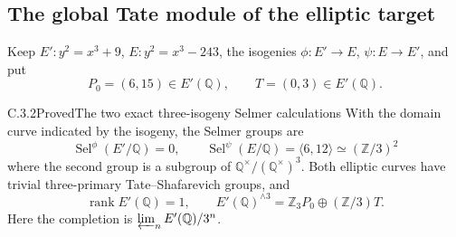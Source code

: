 \subsection{The global Tate module of the elliptic target}
\label{sec:ghost-elliptic-arithmetic}

Keep \(E':y^2=x^3+9\), \(E:y^2=x^3-243\),
the isogenies \(\phi:E'\to E\), \(\psi:E\to E'\),
and put
\[
                  P_0=(6,15)\in E'(\mathbb Q),
                  \qquad T=(0,3)\in E'(\mathbb Q).
\]

\begin{result}{C.3.2}{Proved}{The two exact three-isogeny Selmer calculations}
\label{prop:ghost-elliptic-selmer}
With the domain curve indicated by the isogeny, the
Selmer groups are
\[
 \operatorname{Sel}^{\phi}(E'/\mathbb Q)=0,
 \qquad
 \operatorname{Sel}^{\psi}(E/\mathbb Q)
      =\langle6,12\rangle\simeq(\mathbb Z/3)^2
\]
where the second group is a subgroup of
\(\mathbb Q^\times/(\mathbb Q^\times)^3\).
Both elliptic curves
have trivial three-primary Tate--Shafarevich groups,
and
\[
 \operatorname{rank} E'(\mathbb Q)=1,
 \qquad E'(\mathbb Q)^{\wedge3}
          =\mathbb Z_3 P_0\oplus(\mathbb Z/3)T.
\]
Here the completion is \(\varprojlim_n E'(\mathbb Q)/3^n\).
\end{result}
